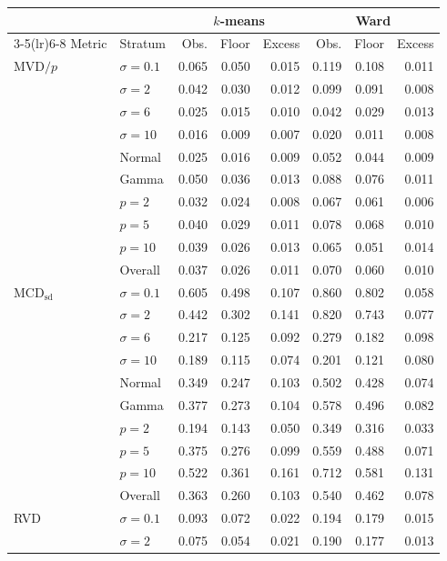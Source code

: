 \begin{tabular}{llrrrrrr}
\toprule
 & & \multicolumn{3}{c}{$k$-means} & \multicolumn{3}{c}{Ward} \\
\cmidrule(lr){3-5}\cmidrule(lr){6-8}
Metric & Stratum & Obs. & Floor & Excess & Obs. & Floor & Excess \\
\midrule
MVD$/p$ & $\sigma=0.1$ & 0.065 & 0.050 & 0.015 & 0.119 & 0.108 & 0.011 \\
 & $\sigma=2$ & 0.042 & 0.030 & 0.012 & 0.099 & 0.091 & 0.008 \\
 & $\sigma=6$ & 0.025 & 0.015 & 0.010 & 0.042 & 0.029 & 0.013 \\
 & $\sigma=10$ & 0.016 & 0.009 & 0.007 & 0.020 & 0.011 & 0.008 \\
 & Normal & 0.025 & 0.016 & 0.009 & 0.052 & 0.044 & 0.009 \\
 & Gamma & 0.050 & 0.036 & 0.013 & 0.088 & 0.076 & 0.011 \\
 & $p=2$ & 0.032 & 0.024 & 0.008 & 0.067 & 0.061 & 0.006 \\
 & $p=5$ & 0.040 & 0.029 & 0.011 & 0.078 & 0.068 & 0.010 \\
 & $p=10$ & 0.039 & 0.026 & 0.013 & 0.065 & 0.051 & 0.014 \\
 & Overall & 0.037 & 0.026 & 0.011 & 0.070 & 0.060 & 0.010 \\
\addlinespace
MCD$_{\mathrm{sd}}$ & $\sigma=0.1$ & 0.605 & 0.498 & 0.107 & 0.860 & 0.802 & 0.058 \\
 & $\sigma=2$ & 0.442 & 0.302 & 0.141 & 0.820 & 0.743 & 0.077 \\
 & $\sigma=6$ & 0.217 & 0.125 & 0.092 & 0.279 & 0.182 & 0.098 \\
 & $\sigma=10$ & 0.189 & 0.115 & 0.074 & 0.201 & 0.121 & 0.080 \\
 & Normal & 0.349 & 0.247 & 0.103 & 0.502 & 0.428 & 0.074 \\
 & Gamma & 0.377 & 0.273 & 0.104 & 0.578 & 0.496 & 0.082 \\
 & $p=2$ & 0.194 & 0.143 & 0.050 & 0.349 & 0.316 & 0.033 \\
 & $p=5$ & 0.375 & 0.276 & 0.099 & 0.559 & 0.488 & 0.071 \\
 & $p=10$ & 0.522 & 0.361 & 0.161 & 0.712 & 0.581 & 0.131 \\
 & Overall & 0.363 & 0.260 & 0.103 & 0.540 & 0.462 & 0.078 \\
\addlinespace
RVD & $\sigma=0.1$ & 0.093 & 0.072 & 0.022 & 0.194 & 0.179 & 0.015 \\
 & $\sigma=2$ & 0.075 & 0.054 & 0.021 & 0.190 & 0.177 & 0.013 \\

\end{tabular}
